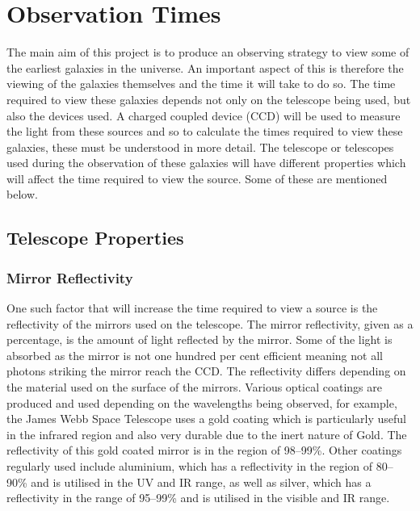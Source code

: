 \section{Observation Times} %
\label{sec:observation_times}
	The main aim of this project is to produce an observing strategy to view some of the earliest galaxies in the universe. An important aspect of this is therefore the viewing of the galaxies themselves and the time it will take to do so. The time required to view these galaxies depends not only on the telescope being used, but also the devices used. A charged coupled device (CCD) will be used to measure the light from these sources and so to calculate the times required to view these galaxies, these must be understood in more detail. The telescope or telescopes used during the observation of these galaxies will have different properties which will affect the time required to view the source. Some of these are mentioned below.

	\subsection{Telescope Properties} %
	\label{sub:telescope_properties}

		\subsubsection{Mirror Reflectivity} %
		\label{ssub:mirror_reflectivity}
			One such factor that will increase the time required to view a source is the reflectivity of the mirrors used on the telescope. The mirror reflectivity, given as a percentage, is the amount of light reflected by the mirror. Some of the light is absorbed as the mirror is not one hundred per cent efficient meaning not all photons striking the mirror reach the CCD. The reflectivity differs depending on the material used on the surface of the mirrors. Various optical coatings are produced and used depending on the wavelengths being observed, for example, the James Webb Space Telescope uses a gold coating which is particularly useful in the infrared region and also very durable due to the inert nature of Gold. The reflectivity of this gold coated mirror is in the region of 98--99\%\cite{Quantum_Coatings_Incorporated}. Other coatings regularly used include aluminium, which has a reflectivity in the region of 80--90\% and is utilised in the UV and IR range, as well as silver, which has a reflectivity in the range of 95--99\% and is utilised in the visible and IR range.

